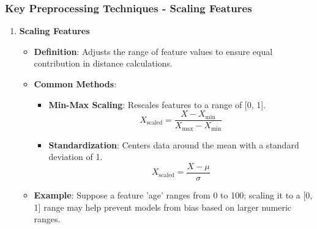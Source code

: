 \documentclass[aspectratio=169]{beamer}
\begin{document}
\begin{frame}[fragile]
    \frametitle{Key Preprocessing Techniques - Scaling Features}
    \begin{enumerate}
        \item \textbf{Scaling Features}
            \begin{itemize}
                \item \textbf{Definition}: Adjusts the range of feature values to ensure equal contribution in distance calculations.
                \item \textbf{Common Methods}:
                    \begin{itemize}
                        \item \textbf{Min-Max Scaling}: Rescales features to a range of [0, 1].
                        \begin{equation}
                            X_{\text{scaled}} = \frac{X - X_{\text{min}}}{X_{\text{max}} - X_{\text{min}}}
                        \end{equation}
                        \item \textbf{Standardization}: Centers data around the mean with a standard deviation of 1.
                        \begin{equation}
                            X_{\text{scaled}} = \frac{X - \mu}{\sigma}
                        \end{equation}
                    \end{itemize}
                \item \textbf{Example}: Suppose a feature 'age' ranges from 0 to 100; scaling it to a [0, 1] range may help prevent models from bias based on larger numeric ranges.
            \end{itemize}
    \end{enumerate}
\end{frame}
\end{document}
